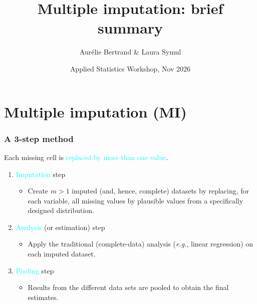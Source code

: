 \documentclass{beamer}
\title{Multiple imputation: brief summary}
\author{Aur\'elie Bertrand \& Laura Symul}
\date{Applied Statistics Workshop, Nov 2026}
\institute{SMCS, ISBA}
\begin{document}

\begin{frame}[plain]
 \titlepage
\end{frame}


\section{Multiple imputation (MI)}


\begin{frame}
\frametitle{A 3-step method}

Each missing cell is \textcolor{cyan}{replaced by more than one value}. %

\vspace{0.3cm}

		\begin{enumerate}
			\item \textcolor{cyan}{Imputation} step 
				\begin{itemize}
					\item Create $m>1$ imputed (and, hence, complete) datasets by replacing, for each variable, all missing values by plausible values from a specifically designed distribution.
				\end{itemize}
			\item \textcolor{cyan}{Analysis} (or estimation) step
				\begin{itemize}
					\item Apply the traditional (complete-data) analysis (\textit{e.g.}, linear regression) on each imputed dataset.
				\end{itemize}
			\item \textcolor{cyan}{Pooling} step
				\begin{itemize}
					\item Results from the different data sets are pooled to obtain the final estimates. 
				\end{itemize}
		\end{enumerate}
\end{frame}
\end{document}
